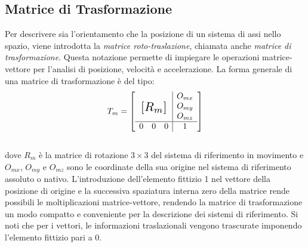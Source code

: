\subsection{Matrice di Trasformazione}
Per descrivere sia l'orientamento che la posizione di un sistema di assi nello spazio, viene introdotta la \textit{matrice roto-traslazione}, chiamata anche \textit{matrice di trasformazione}. Questa notazione permette di impiegare le operazioni matrice-vettore per l'analisi di posizione, velocità e accelerazione. La forma generale di una matrice di trasformazione è del tipo:
%
\begin{equation}
T_m = \left[
\begin{array}{ccc|c}
& & & O_{mx}\\
\multicolumn{3}{c|}{\multirow{3}{*}{\raisebox{20mm}{\scalebox{1.5}{$[R_m]$}}}} & O_{my}\\
& & & O_{mz}\\ \hline
0 & 0 & 0 & 1
\end{array}\right]
\end{equation}\\
%
dove $R_m$ è la matrice di rotazione $3 \times 3$ del sistema di riferimento in movimento e $O_{mx}$, $O_{my}$ e $O_{mz}$ sono le coordinate della sua origine nel sistema di riferimento assoluto o nativo. L'introduzione dell'elemento fittizio 1 nel vettore della posizione di origine e la successiva spaziatura interna zero della matrice rende possibili le moltiplicazioni matrice-vettore, rendendo la matrice di trasformazione un modo compatto e conveniente per la descrizione dei sistemi di riferimento. Si noti che per i vettori, le informazioni traslazionali vengono trascurate imponendo l'elemento fittizio pari a 0.